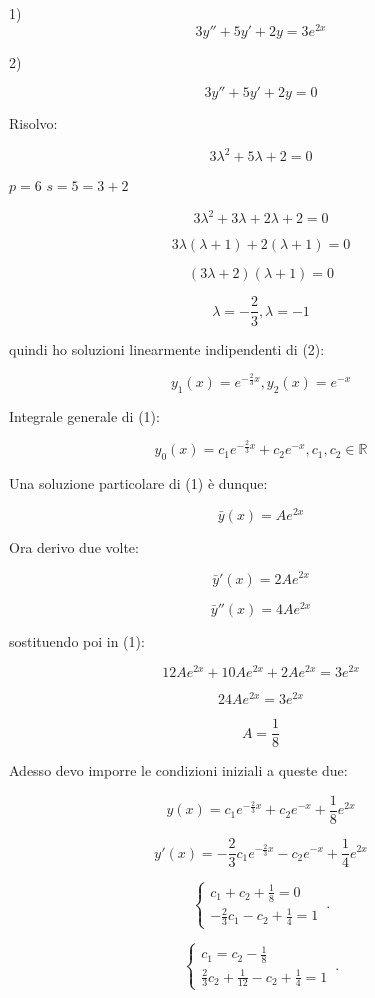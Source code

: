 \documentclass[../appunti-analisi.tex]{subfiles}
\begin{document}
1)
\[
    3y''+5y'+2y = 3 e^{2x}
\]

2)

\[
    3y''+5y'+2y = 0
\]

Risolvo:

\[
    3 \lambda ^{2} + 5 \lambda + 2 = 0
\]

$p = 6$ $s=5= 3+2$ 

\[
    3 \lambda^{2} + 3 \lambda + 2 \lambda + 2 =0
\]

\[
    3 \lambda ( \lambda+1) + 2( \lambda + 1) =0
\]

\[
    (3 \lambda +2 ) ( \lambda +1 ) =0
\]

\[
    \lambda= -\frac{2}{3}, \lambda=-1
\]

quindi ho soluzioni linearmente indipendenti di (2):

\[
    y_1(x) = e ^{-\frac{2}{3}x}, y_2(x) = e ^{-x}
\]

Integrale generale di (1):

\[
    y_0(x) = c_1 e^{-\frac{2}{3}x} + c_2 e ^{-x},c_1,c_2 \in \mathbb{R}
\]


Una soluzione particolare di (1) è dunque:

\[
    \bar{y} (x) = A e ^{2x}
\]

Ora derivo due volte:

\[
    \bar{y} '(x) = 2A e ^{2x}
\]

\[
    \bar{y} ''(x) = 4A e ^{2x}
\]

sostituendo poi in (1):

\[
    12Ae ^{2x} + 10 A e ^{2x} + 2 A e ^{2x} = 3 e^{2x}
\]

\[
    24A e ^{2x} = 3 e ^{2x}
\]

\[
    A = \frac{1}{8}
\]

Adesso devo imporre le condizioni iniziali a queste due:

\[
    y(x) = c_1 e ^{-\frac{2}{3}x} + c_2 e ^{-x}+ \frac{1}{8}e ^{2x}
\]

\[
    y'(x) = -\frac{2}{3}c_1 e ^{-\frac{2}{3}x} - c_2 e ^{-x}+ \frac{1}{4} e ^{2x}
\]


    \begin{equation}
        \begin{cases}
            c_1+c_2+\frac{1}{8}=0\\
            -\frac{2}{3}c_1-c_2+\frac{1}{4}=1
        \end{cases}\,.
    \end{equation}

    \begin{equation}
        \begin{cases}
            c_1=c_2-\frac{1}{8}\\
            \frac{2}{3}c_2+\frac{1}{12}-c_2+\frac{1}{4}=1
        \end{cases}\,.
    \end{equation}
\end{document}
